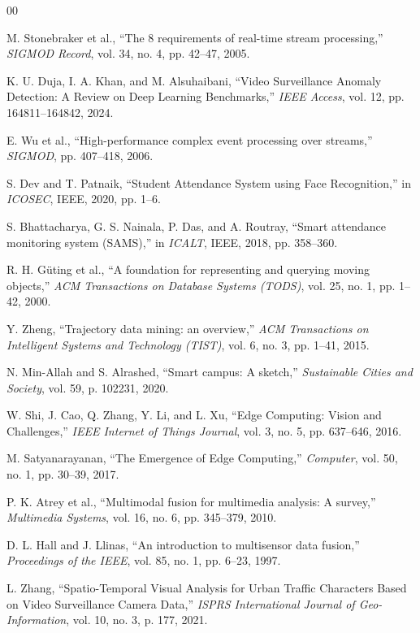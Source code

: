 \documentclass[conference]{IEEEtran}
\begin{document}
\begin{thebibliography}{00}

 M. Stonebraker et al., ``The 8 requirements of real-time stream processing,'' \textit{SIGMOD Record}, vol. 34, no. 4, pp. 42--47, 2005.

 K. U. Duja, I. A. Khan, and M. Alsuhaibani, ``Video Surveillance Anomaly Detection: A Review on Deep Learning Benchmarks,'' \textit{IEEE Access}, vol. 12, pp. 164811--164842, 2024.

 E. Wu et al., ``High-performance complex event processing over streams,'' \textit{SIGMOD}, pp. 407--418, 2006.

 S. Dev and T. Patnaik, ``Student Attendance System using Face Recognition,'' in \textit{ICOSEC}, IEEE, 2020, pp. 1--6.

 S. Bhattacharya, G. S. Nainala, P. Das, and A. Routray, ``Smart attendance monitoring system (SAMS),'' in \textit{ICALT}, IEEE, 2018, pp. 358--360.

 R. H. G\"{u}ting et al., ``A foundation for representing and querying moving objects,'' \textit{ACM Transactions on Database Systems (TODS)}, vol. 25, no. 1, pp. 1--42, 2000.

 Y. Zheng, ``Trajectory data mining: an overview,'' \textit{ACM Transactions on Intelligent Systems and Technology (TIST)}, vol. 6, no. 3, pp. 1--41, 2015.

 N. Min-Allah and S. Alrashed, ``Smart campus: A sketch,'' \textit{Sustainable Cities and Society}, vol. 59, p. 102231, 2020.

 W. Shi, J. Cao, Q. Zhang, Y. Li, and L. Xu, ``Edge Computing: Vision and Challenges,'' \textit{IEEE Internet of Things Journal}, vol. 3, no. 5, pp. 637--646, 2016.

 M. Satyanarayanan, ``The Emergence of Edge Computing,'' \textit{Computer}, vol. 50, no. 1, pp. 30--39, 2017.

 P. K. Atrey et al., ``Multimodal fusion for multimedia analysis: A survey,'' \textit{Multimedia Systems}, vol. 16, no. 6, pp. 345--379, 2010.

 D. L. Hall and J. Llinas, ``An introduction to multisensor data fusion,'' \textit{Proceedings of the IEEE}, vol. 85, no. 1, pp. 6--23, 1997.

 L. Zhang, ``Spatio-Temporal Visual Analysis for Urban Traffic Characters Based on Video Surveillance Camera Data,'' \textit{ISPRS International Journal of Geo-Information}, vol. 10, no. 3, p. 177, 2021.


\end{thebibliography}
\end{document}

